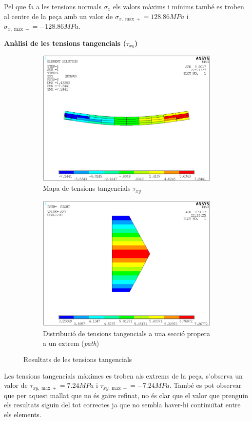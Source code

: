 \documentclass[a4paper]{article}
\def\imgS{0.42\textwidth}
\begin{document}
Pel que fa a les tensions normals $\sigma_x$ els valors màxims i mínims també es troben al centre de la peça amb un valor de $\sigma_{x,\max+} = 128.86 MPa$ i $\sigma_{x,\max-} = -128.86 MPa$.

\pagebreak
\textbf{Anàlisi de les tensions tangencials ($\tau_{xy}$)}
\begin{figure}[H]
	\begin{subfigure}[t]{\imgS}
		\includegraphics[width=\textwidth]{images/40_SXY}
		\caption{Mapa de tensions tangencials {$\tau_{xy}$}}
		\label{fig:40_SXY}
	\end{subfigure}
	\hfill
	\begin{subfigure}[t]{\imgS}
		\includegraphics[width=\textwidth]{images/40_SXY_path}
		\caption{Distribució de tensions tangencials a una secció propera a un extrem (\emph{path})}
		\label{fig:40_SXY_path}
	\end{subfigure}
	\caption{Resultats de les tensions tangencials}
	\label{fig:40_shear}
\end{figure}
Les tensions tangencials màximes es troben als extrems de la peça, s'observa un valor de $\tau_{xy,\max+} = 7.24 MPa$ i $\tau_{xy,\max-} = -7.24 MPa$. També es pot observar que per aquest mallat que no és gaire refinat, no és clar que el valor que prenguin els resultats siguin del tot correctes ja que no sembla haver-hi continuïtat entre els elements.
\end{document}

